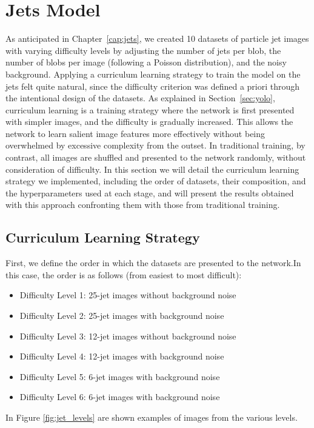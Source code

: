 \section{Jets Model}
As anticipated in Chapter~\ref{cap:jets}, we created 10 datasets of particle jet images with varying difficulty levels by adjusting the number of jets per blob, the number of blobs per image (following a Poisson distribution), and the noisy background.
Applying a curriculum learning strategy to train the model on the jets felt quite natural, since the difficulty criterion was defined a priori through the intentional design of the datasets. As explained in Section~\ref{sec:yolo}, curriculum learning is a training strategy where the network is first presented with simpler images, and the difficulty is gradually increased. This allows the network to learn salient image features more effectively without being overwhelmed by excessive complexity from the outset.
In traditional training, by contrast, all images are shuffled and presented to the network randomly, without consideration of difficulty.
In this section we will detail the curriculum learning strategy we implemented, including the order of datasets, their composition, and the hyperparameters used at each stage, and will present the results obtained with this approach confronting them with those from traditional training.
\subsection*{Curriculum Learning Strategy}
First, we define the order in which the datasets are presented to the network.In this case, the order is as follows (from easiest to most difficult):
\begin{itemize}
\item Difficulty Level 1: 25-jet images without background noise
\item Difficulty Level 2: 25-jet images with background noise
\item Difficulty Level 3: 12-jet images without background noise
\item Difficulty Level 4: 12-jet images with background noise
\item Difficulty Level 5: 6-jet images with background noise
\item Difficulty Level 6: 6-jet images with background noise
\end{itemize}

In Figure \ref{fig:jet_levels} are shown examples of images from the various levels.

